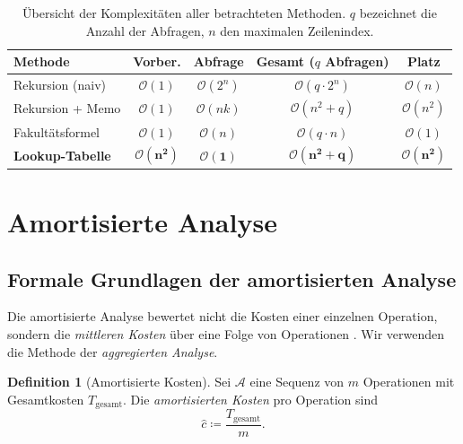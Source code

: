 ﻿\documentclass[12pt, a4paper]{article}
\newcommand{\Oh}{\mathcal{O}}
\theoremstyle{plain}
\theoremstyle{definition}
\newtheorem{definition}[theorem]{Definition}
\theoremstyle{remark}
\renewcommand{\Oh}{\mathcal{O}}
\begin{document}
\begin{table}[H]
  \centering
  \caption{Übersicht der Komplexitäten aller betrachteten Methoden.
    $q$ bezeichnet die Anzahl der Abfragen, $n$ den maximalen Zeilenindex.}
  \label{tab:komplexitaeten}
  \begin{tabular}{lcccc}
    \toprule
    \textbf{Methode} & \textbf{Vorber.} & \textbf{Abfrage} &
    \textbf{Gesamt ($q$ Abfragen)} & \textbf{Platz} \\
    \midrule
    Rekursion (naiv) & $\Oh(1)$ & $\Oh(2^n)$ & $\Oh(q \cdot 2^n)$ & $\Oh(n)$ \\
    Rekursion + Memo & $\Oh(1)$ & $\Oh(nk)$ & $\Oh(n^2 + q)$ & $\Oh(n^2)$ \\
    Fakultätsformel  & $\Oh(1)$ & $\Oh(n)$  & $\Oh(q \cdot n)$   & $\Oh(1)$ \\
    \textbf{Lookup-Tabelle} & $\mathbf{\Oh(n^2)}$ & $\mathbf{\Oh(1)}$ &
    $\mathbf{\Oh(n^2 + q)}$ & $\mathbf{\Oh(n^2)}$ \\
    \bottomrule
  \end{tabular}
\end{table}


\section{Amortisierte Analyse}
\label{sec:amortisiert}

\subsection{Formale Grundlagen der amortisierten Analyse}

Die amortisierte Analyse bewertet nicht die Kosten einer einzelnen
Operation, sondern die \emph{mittleren Kosten} über eine Folge von
Operationen \cite{cormen2009introduction}. Wir verwenden die Methode
der \emph{aggregierten Analyse}.

\begin{definition}[Amortisierte Kosten]
  Sei $\mathcal{A}$ eine Sequenz von $m$ Operationen mit Gesamtkosten
  $T_{\text{gesamt}}$. Die \emph{amortisierten Kosten} pro Operation sind
  \begin{equation}
    \hat{c} \coloneqq \frac{T_{\text{gesamt}}}{m}.
  \end{equation}
\end{definition}
\end{document}
